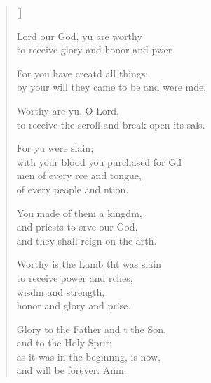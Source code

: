 \settowidth{\versewidth}{to receive the scroll and break open its seals.}
\begin{verse}[\versewidth]
  \begin{patverse}
 Lord our God, yu are worthy\Med\\
to receive glory and honor and pwer.

For you have creatd all things;\Med\\
by your will they came to be and were mde.

Worthy are yu, O Lord,\Med\\
to receive the scroll and break open its sals.

For yu were slain;\Med\\
with your blood you purchased for Gd\\
men of every rce and tongue,\Med\\
of every people and ntion.

You made of them a kingdm,\Flex\\
and priests to srve our God,\Med\\
and they shall reign on the arth.

Worthy is the Lamb tht was slain\Med\\
to receive power and rches,\Med\\
wisdm and strength,\\
honor and glory and prise.

Glory to the Father and t the Son,\Med\\
and to the Holy Sprit:\\
as it was in the beginnng, is now,\Med\\
and will be forever. Amn.
  \end{patverse}
\end{verse}
